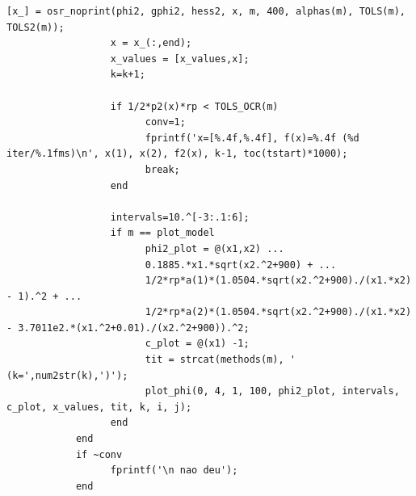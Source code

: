\documentclass[10pt, a4paper]{article}
\begin{document}
\begin{minipage}{\linewidth}
\begin{lstlisting}[style=myStyle, caption= trecho de c\'odigo do problema 02 (penalidade) (2/2), label=list_p02_pen_2]
                  [x_] = osr_noprint(phi2, gphi2, hess2, x, m, 400, alphas(m), TOLS(m), TOLS2(m));
                  x = x_(:,end);
                  x_values = [x_values,x];
                  k=k+1;

                  if 1/2*p2(x)*rp < TOLS_OCR(m)
                        conv=1;
                        fprintf('x=[%.4f,%.4f], f(x)=%.4f (%d iter/%.1fms)\n', x(1), x(2), f2(x), k-1, toc(tstart)*1000);
                        break;
                  end

                  intervals=10.^[-3:.1:6];
                  if m == plot_model
                        phi2_plot = @(x1,x2) ...
                        0.1885.*x1.*sqrt(x2.^2+900) + ...
                        1/2*rp*a(1)*(1.0504.*sqrt(x2.^2+900)./(x1.*x2) - 1).^2 + ...
                        1/2*rp*a(2)*(1.0504.*sqrt(x2.^2+900)./(x1.*x2) - 3.7011e2.*(x1.^2+0.01)./(x2.^2+900)).^2;
                        c_plot = @(x1) -1;
                        tit = strcat(methods(m), ' (k=',num2str(k),')');
                        plot_phi(0, 4, 1, 100, phi2_plot, intervals, c_plot, x_values, tit, k, i, j);
                  end
            end
            if ~conv
                  fprintf('\n nao deu');
            end
      \end{lstlisting}
\end{minipage}
\end{document}
